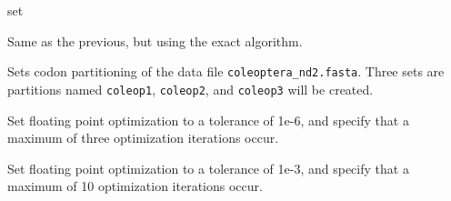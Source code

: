 \begin{command}{set}{}
\begin{poyexamples}
{Same as the previous, but using the exact algorithm.}

{Sets codon partitioning of the data file \texttt{coleoptera\_nd2.fasta}. Three
sets are partitions named \texttt{coleop1}, \texttt{coleop2}, and
\texttt{coleop3} will be created.}

{Set floating point optimization to a tolerance of 1e-6, and specify that
a maximum of three optimization iterations occur.}

{Set floating point optimization to a tolerance of 1e-3, and specify that
a maximum of 10 optimization iterations occur.}

\end{poyexamples}

\begin{poyalso}
\end{poyalso}

\end{command}


